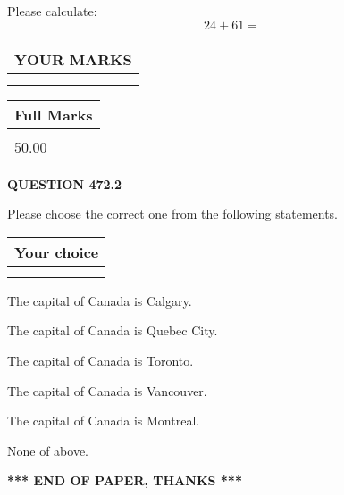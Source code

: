 \documentclass[12pt]{article}
\begin{document}
  
 
Please calculate:
\begin{equation}
24 +  %
61 = \nonumber
\end{equation}
 

 

 
  
\vspace{0.2in}
  
\noindent\begin{tabular}{|l|}
\hline
 YOUR MARKS  \\
\hline
 \\ 
 \\ 
\hline
\end{tabular}
\hspace{0.05in} \begin{tabular}{|l|}
\hline
 Full Marks  \\
\hline
 \\ 
50.00 \\
\hline
\end{tabular}
{\textbf{\Large{QUESTION
472.2 
}}}
  
  
Please choose the correct one from the following statements.
  
  
\noindent\hspace{3.0in} \begin{tabular}{|l|}
\hline
Your choice \\
\hline
 \\ 
 \\ 
\hline
\end{tabular}
  
  
 
 
The capital of Canada is Calgary.
 
 
The capital of Canada is Quebec City.
 
 
The capital of Canada is Toronto.
 
 
The capital of Canada is Vancouver.
 
 
The capital of Canada is Montreal.
 
 
 None of above.
 
 
   
   
 \vspace{0.2in}
 
   
   
   
   
\vspace{1.0in} 
{\textbf{\large{ *** END OF PAPER, THANKS *** }}} 
   
\end{document}
